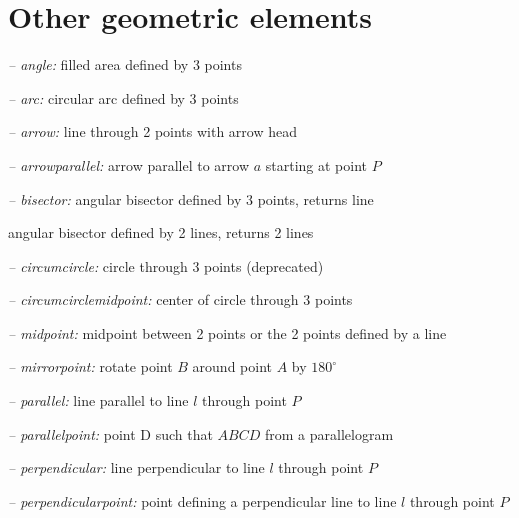 \section{Other geometric elements}
{\sl -- angle:} \hfill filled area defined by 3 points
\par{\sl -- arc:} \hfill circular arc defined by 3 points
\par{\sl -- arrow:} \hfill line through 2 points with arrow head
\par{\sl -- arrowparallel:} \hfill arrow parallel to arrow $a$ starting at point $P$
\par{\sl -- bisector:} \hfill angular bisector defined by 3 points, returns line
\par{} \hfill angular bisector defined by 2 lines, returns 2 lines
\par{\sl -- circumcircle:} \hfill circle through 3 points (deprecated)
\par{\sl -- circumcirclemidpoint:} \hfill center of circle through 3 points
\par{\sl -- midpoint:} midpoint between 2 points or the 2 points defined by a line

\par{\sl -- mirrorpoint:} \hfill rotate point $B$ around point $A$ by $180^\circ$
\par{\sl -- parallel:} \hfill line parallel to line $l$ through point $P$
\par{\sl -- parallelpoint:} \hfill point D such that $ABCD$ from a parallelogram
\par{\sl -- perpendicular:} \hfill line perpendicular to line $l$ through point $P$
\par{\sl -- perpendicularpoint:} \hfill  point defining a perpendicular line to line $l$ through point $P$

